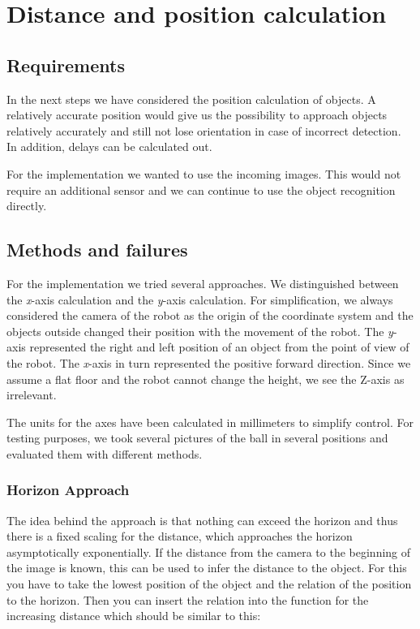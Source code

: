 \section{Distance and position calculation}
\label{Distance and position calculation}
\subsection{Requirements}
In the next steps we have considered the position calculation of objects. A relatively accurate position would give us the possibility to approach objects relatively accurately and still not lose orientation in case of incorrect detection. In addition, delays can be calculated out.

For the implementation we wanted to use the incoming images. This would not require an additional sensor and we can continue to use the object recognition directly.

\subsection{Methods and failures}
For the implementation we tried several approaches. We distinguished between the \textit{x}-axis calculation and the \textit{y}-axis calculation. For simplification, we always considered the camera of the robot as the origin of the coordinate system and the objects outside changed their position with the movement of the robot. The \textit{y}-axis represented the right and left position of an object from the point of view of the robot. The \textit{x}-axis in turn represented the positive forward direction. Since we assume a flat floor and the robot cannot change the height, we see the Z-axis as irrelevant.

The units for the axes have been calculated in millimeters to simplify control.
For testing purposes, we took several pictures of the ball in several positions and
evaluated them with different methods.

\subsubsection{Horizon Approach}
The idea behind the approach is that nothing can exceed the horizon and thus there is a fixed scaling for the distance, which approaches the horizon asymptotically exponentially.
If the distance from the camera to the beginning of the image is known, this can be used to infer the distance to the object. For this you have to take the lowest position of the object and the relation of the position to the horizon. Then you can insert the relation into the function for the increasing distance which should be similar to this:

